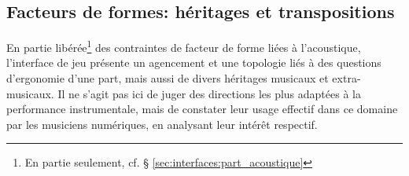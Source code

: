 
\subsection{Facteurs de formes: héritages et transpositions}
\label{sec:interfaces:heritages}

\noindent En partie libérée\footnote{En partie seulement, cf. § \ref{sec:interfaces:part_acoustique}} des contraintes de facteur de forme liées à l'acoustique, l'interface de jeu présente un agencement et une topologie liés à des questions d'ergonomie d'une part, mais aussi de divers héritages musicaux et extra-musicaux. Il ne s'agit pas ici de juger des directions les plus adaptées à la performance instrumentale, mais de constater leur usage effectif dans ce domaine par les musiciens numériques, en analysant leur intérêt respectif.

